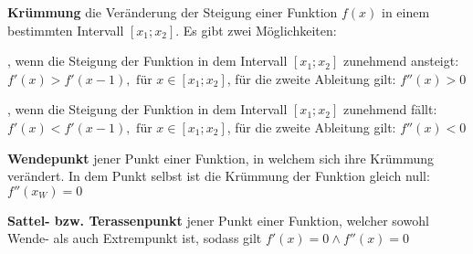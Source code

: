 \textbf{Kr\"{u}mmung}  die Ver\"{a}nderung der Steigung einer Funktion $f(x)$ in einem bestimmten Intervall $[x_{1}; x_{2}]$. Es gibt zwei M\"{o}glichkeiten:

\begin{itemize}
	, wenn die Steigung der Funktion in dem Intervall $[x_{1}; x_{2}]$ zunehmend ansteigt: $f'(x) > f'(x-1), \text{ f\"{u}r } x \in [x_{1}; x_{2}]$, f\"{u}r die zweite Ableitung gilt: $f''(x) > 0$

	, wenn die Steigung der Funktion in dem Intervall $[x_{1}; x_{2}]$ zunehmend f\"{a}llt: $f'(x) < f'(x-1), \text{ f\"{u}r } x \in [x_{1}; x_{2}]$, f\"{u}r die zweite Ableitung gilt: $f''(x) < 0$
\end{itemize}

\textbf{Wendepunkt}  jener Punkt einer Funktion, in welchem sich ihre Kr\"{u}mmung ver\"{a}ndert. In dem Punkt selbst ist die Kr\"{u}mmung der Funktion gleich null: $f''(x_{W}) = 0$

\begin{figure}[h!]
\centering
\end{figure}

\textbf{Sattel- bzw. Terassenpunkt}  jener Punkt einer Funktion, welcher sowohl Wende- als auch Extrempunkt ist, sodass gilt $f'(x) = 0 \land f''(x) = 0$

